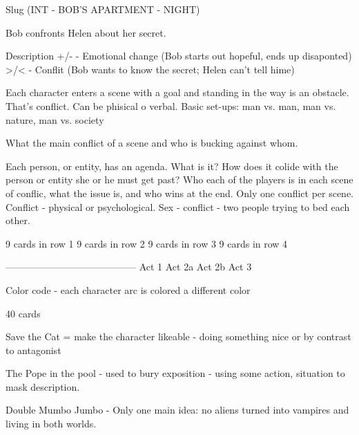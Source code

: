 Slug (INT - BOB'S APARTMENT - NIGHT)

Bob confronts Helen about her secret.

Description
+/- - Emotional change (Bob starts out hopeful, ends up disaponted)
>/< - Conflit (Bob wants to know the secret; Helen can't tell hime)

Each character enters a scene with a goal and standing in the way is an obstacle. That's conflict. Can be phisical o verbal.
Basic set-ups: man vs. man, man vs. nature, man vs. society

What the main conflict of a scene and who is bucking against whom. 

Each person, or entity, has an agenda.
What is it?
How does it colide with the person or entity she or he must get past? 
Who each of the players is in each scene of conflic, what the issue is, and who wins at the end. Only one conflict per scene.
Conflict - physical or psychological. 
Sex - conflict - two people trying to bed each other.

9 cards in row 1
9 cards in row 2
9 cards in row 3
9 cards in row 4



-----------------------------------------
Act 1
Act 2a
Act 2b
Act 3

Color code - each character arc is colored a different color

40 cards

Save the Cat = make the character likeable - doing something nice or by contrast to antagonist

The Pope in the pool - used to bury exposition - using some action, situation to mask description.

Double Mumbo Jumbo - Only one main idea: no aliens turned into vampires and living in both worlds. 










